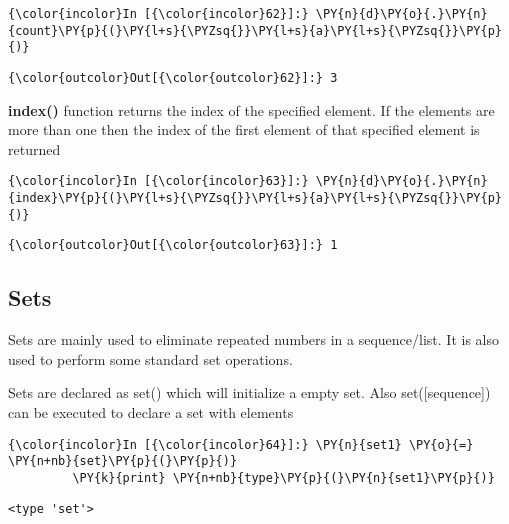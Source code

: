     \begin{Verbatim}[commandchars=\\\{\}]
{\color{incolor}In [{\color{incolor}62}]:} \PY{n}{d}\PY{o}{.}\PY{n}{count}\PY{p}{(}\PY{l+s}{\PYZsq{}}\PY{l+s}{a}\PY{l+s}{\PYZsq{}}\PY{p}{)}
\end{Verbatim}

            \begin{Verbatim}[commandchars=\\\{\}]
{\color{outcolor}Out[{\color{outcolor}62}]:} 3
\end{Verbatim}
        
    \textbf{index()} function returns the index of the specified element. If
the elements are more than one then the index of the first element of
that specified element is returned

    \begin{Verbatim}[commandchars=\\\{\}]
{\color{incolor}In [{\color{incolor}63}]:} \PY{n}{d}\PY{o}{.}\PY{n}{index}\PY{p}{(}\PY{l+s}{\PYZsq{}}\PY{l+s}{a}\PY{l+s}{\PYZsq{}}\PY{p}{)}
\end{Verbatim}

            \begin{Verbatim}[commandchars=\\\{\}]
{\color{outcolor}Out[{\color{outcolor}63}]:} 1
\end{Verbatim}
        
    \subsection{Sets}\label{sets}

    Sets are mainly used to eliminate repeated numbers in a sequence/list.
It is also used to perform some standard set operations.

Sets are declared as set() which will initialize a empty set. Also
set({[}sequence{]}) can be executed to declare a set with elements

    \begin{Verbatim}[commandchars=\\\{\}]
{\color{incolor}In [{\color{incolor}64}]:} \PY{n}{set1} \PY{o}{=} \PY{n+nb}{set}\PY{p}{(}\PY{p}{)}
         \PY{k}{print} \PY{n+nb}{type}\PY{p}{(}\PY{n}{set1}\PY{p}{)}
\end{Verbatim}

    \begin{Verbatim}[commandchars=\\\{\}]
<type 'set'>
    \end{Verbatim}

